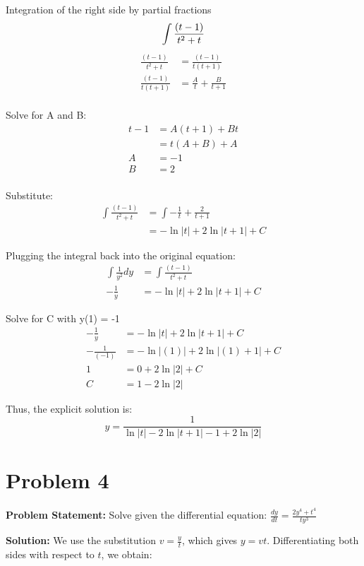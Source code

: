 \documentclass[12pt, letterpaper]{article}
\begin{document}
Integration of the right side by partial fractions
\[\int \frac{(t-1)}{t^{2}+t} \\ \]
\begin{align*}
\frac{(t-1)}{t^{2}+t} &= \frac{(t-1)}{t(t+1)} \\
\frac{(t-1)}{t(t+1)} &= \frac{A}{t} + \frac{B}{t+1} \\
\end{align*}

\quad Solve for A and B:
\begin{align*}
t-1 &= A(t+1) + Bt \\  
&= t(A+B) + A \\
A &= -1 \\
B &= 2 \\
\end{align*}

\quad Substitute:
\begin{align*}
\int \frac{(t-1)}{t^{2}+t} &= \int -\frac{1}{t} + \frac{2}{t+1} \\
&= -\ln|t| + 2 \ln|t+1| + C
\end{align*}

Plugging the integral back into the original equation:
\begin{align*}
\int \frac{1}{y^{2}}dy&= \int \frac{(t-1)}{t^{2}+t} \\
-\frac{1}{y} &= -\ln|t| + 2 \ln|t+1| + C
\end{align*}

Solve for C with y(1) = -1
\begin{align*}
-\frac{1}{y}&= -\ln|t| + 2 \ln|t+1| + C \\
-\frac{1}{(-1)}&= -\ln|(1)| + 2 \ln|(1)+1| + C \\
1 &= 0 + 2\ln|2| + C \\
C &= 1 - 2 \ln|2|
\end{align*}

Thus, the explicit solution is:
\[
y = \frac{1}{\ln|t| - 2 \ln|t+1| - 1 + 2 \ln|2|}
\]

\section*{Problem 4}
\textbf{Problem Statement:} Solve given the differential equation: $\frac{dy}{dt} = \frac{2y^4 + t^4}{ty^3}$

\textbf{Solution:} We use the substitution \( v = \frac{y}{t} \), which gives \( y = vt \). Differentiating both sides with respect to \( t \), we obtain:
\end{document}
